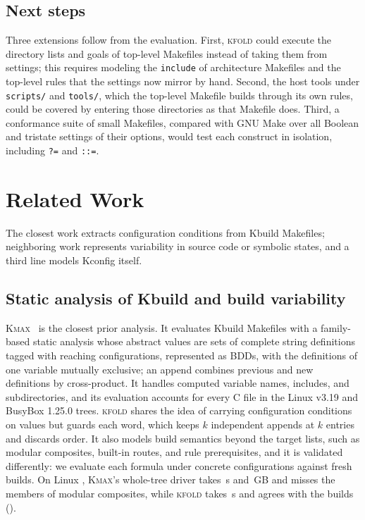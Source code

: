 \documentclass[acmsmall,screen,review]{acmart}
\newcommand{\tool}{\textsc{kfold}\xspace}
\newcommand{\kmax}{\textsc{Kmax}\xspace}
\begin{document}
\subsection{Next steps}
Three extensions follow from the evaluation. First, \tool could execute the directory lists and goals of top-level Makefiles instead of taking them from settings; this requires modeling the \texttt{include} of architecture Makefiles and the top-level rules that the settings now mirror by hand. Second, the host tools under \texttt{scripts/} and \texttt{tools/}, which the top-level Makefile builds through its own rules, could be covered by entering those directories as that Makefile does. Third, a conformance suite of small Makefiles, compared with GNU Make over all Boolean and tristate settings of their options, would test each construct in isolation, including \texttt{?=} and \texttt{::=}.

\section{Related Work}
\label{sec:related}

The closest work extracts configuration conditions from Kbuild Makefiles; neighboring work represents variability in source code or symbolic states, and a third line models Kconfig itself.

\subsection{Static analysis of Kbuild and build variability}
\kmax~\cite{gazzillo2017kmax} is the closest prior analysis. It evaluates Kbuild Makefiles with a family-based static analysis whose abstract values are sets of complete string definitions tagged with reaching configurations, represented as BDDs, with the definitions of one variable mutually exclusive; an append combines previous and new definitions by cross-product. It handles computed variable names, includes, and subdirectories, and its evaluation accounts for every C file in the Linux v3.19 and BusyBox 1.25.0 trees. \tool shares the idea of carrying configuration conditions on values but guards each word, which keeps $k$ independent appends at $k$ entries and discards order. It also models build semantics beyond the target lists, such as modular composites, built-in routes, and rule prerequisites, and it is validated differently: we evaluate each formula under concrete configurations against fresh builds. On Linux \NLinuxVersion, \kmax's whole-tree driver takes \NLinuxKmaxSeconds\,s and \NLinuxKmaxRssGb\,GB and misses the members of modular composites, while \tool takes \NLinuxSeconds\,s and agrees with the builds ().
\end{document}
